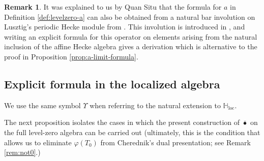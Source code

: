 \documentclass{amsart}
\theoremstyle{definition}
\newtheorem{Rem}[Thm]{Remark}
\numberwithin{equation}{section}
\begin{document}
\begin{Rem}
    It was explained to us by Quan Situ that the formula for \(a\) in Definition \ref{def:levelzero-a} can also be
    obtained from a natural bar involution on Lusztig's periodic Hecke module from \cite{Lgeneric}. This
    involution is introduced in \cite[Theorem~11.2]{LPeriodic}, and writing an explicit formula for this operator on elements arising from the natural inclusion of the affine Hecke algebra gives a derivation which is alternative to the proof in Proposition \ref{prop:a-limit-formula}.
\end{Rem}

\subsection{Explicit formula in the localized algebra}\label{sec:localized-formula}
We use the same symbol $\Upsilon$ when referring to the natural extension to $\mathbb H_{\mathrm{loc}}$.

The next proposition isolates the cases in which the present construction of $\bar{\bullet}$ on the full level-zero algebra can be carried out (ultimately, this is the condition that allows us to eliminate
\(\varphi(T_0)\) from Cherednik's dual presentation; see Remark \ref{rem:not0}.)
\end{document}
